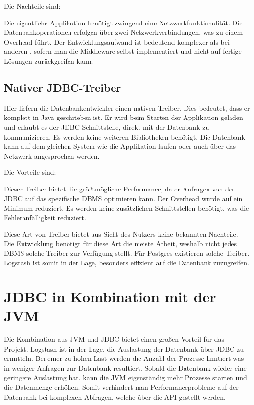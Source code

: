 Die Nachteile sind:

\begin{outline}
  \1 Die eigentliche Applikation benötigt zwingend eine Netzwerkfunktionalität.
  \1 Die Datenbankoperationen erfolgen über zwei Netzwerkverbindungen, was
  zu einem Overhead führt.
  \1 Der Entwicklungsaufwand ist bedeutend komplexer als bei anderen
  , sofern man die \gls{Middleware} selbst
  implementiert und nicht auf fertige Lösungen zurückgreifen kann.
\end{outline}
\tm%

\subsection{Nativer JDBC-Treiber}
Hier liefern die Datenbankentwickler einen nativen \gls{Treiber}. Dies bedeutet,
dass er komplett in Java geschrieben ist. Er wird beim Starten der Applikation
geladen und erlaubt es der \gls{JDBC}\hyp{}Schnittstelle, direkt mit der
Datenbank zu kommunizieren. Es werden keine weiteren Bibliotheken benötigt. Die
Datenbank kann auf dem gleichen System wie die Applikation laufen oder auch
über das Netzwerk angesprochen werden.

Die Vorteile sind:

\begin{outline}
  \1 Dieser \gls{Treiber} bietet die größtmögliche Performance, da er Anfragen
  von der \gls{JDBC} auf das spezifische \gls{DBMS} optimieren kann.
  \1 Der Overhead wurde auf ein Minimum reduziert.
  \1 Es werden keine zusätzlichen Schnittstellen benötigt, was die
  Fehleranfälligkeit reduziert.
\end{outline}

Diese Art von \gls{Treiber} bietet aus Sicht des Nutzers keine bekannten
Nachteile. Die Entwicklung benötigt für diese Art die meiste Arbeit, weshalb
nicht jedes \gls{DBMS} solche \gls{Treiber} zur Verfügung stellt. Für Postgres
existieren solche \gls{Treiber}. Logstash ist somit in der Lage, besonders
effizient auf die Datenbank zuzugreifen.
\tm%

\section{JDBC in Kombination mit der JVM}
Die Kombination aus \gls{JVM} und \gls{JDBC} bietet einen großen Vorteil für
das Projekt. Logstash ist in der Lage, die Auslastung der Datenbank über
\gls{JDBC} zu ermitteln. Bei einer zu hohen Last werden die Anzahl der Prozesse
limitiert was in weniger Anfragen zur Datenbank resultiert. Sobald die
Datenbank wieder eine geringere Auslastung hat, kann die \gls{JVM} eigenständig
mehr Prozesse starten und die Datenmenge erhöhen. Somit verhindert man
Performanceprobleme auf der Datenbank bei komplexen Abfragen, welche über die
\gls{API} gestellt werden.

